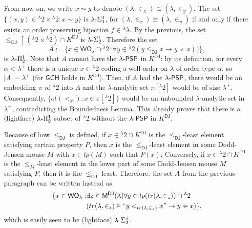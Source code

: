 \documentclass{amsart}
\numberwithin{equation}{section}
\def\hyp{{\hbox{-}}}
\theoremstyle{definition}
\theoremstyle{remark}
\begin{document}
From now on, we write $x \sim y$ to denote $(\lambda,\in_x) \cong (\lambda,\in_y)$.
 The set $\{(x,y)\in{}^{\lambda}2\times{}^{\lambda}2:x\sim y\}$ is $\lambda\hyp\Sigma^1_1$, for $(\lambda,\in_x)\cong(\lambda,\in_y)$ if and only if there exists an order preserving bijection $f\in{}^{\lambda}\lambda$.
By the previous, the set $\leq_{\mathsf{DJ}}\upharpoonright({}^{\lambda}2\times{}^{\lambda}2)\cap K^{\mathsf{DJ}}$ is $\lambda\hyp\Sigma^{1}_{2}$. Therefore the set $$A:=\{x\in\mathsf{WO}_{\lambda}\cap{}^{\lambda}2:\forall y\in{}^{\lambda}2(y\leq_{\mathsf{DJ}}x\rightarrow 
y\nsim x))\},$$ is $\lambda\hyp\Pi^{1}_{2}$. Note that $A$ cannot have the $\lambda\hyp\mathsf{PSP}$ in $K^{\mathsf{DJ}}$: by its definition, for every $\alpha<\lambda^{+}$ there is a unique $x\in{}^{\lambda}2$ coding a well-order on $\lambda$ of order type $\alpha$, so $|A|=\lambda^{+}$ (for $\mathsf{GCH}$ holds in $K^{\mathsf{DJ}}$). Then, if $A$ had the $\lambda\hyp\mathsf{PSP}$, there would be an embedding $\pi$ of ${}^{\lambda}2$ into $A$ and the $\lambda$-analytic set $\pi[{}^{\lambda}2]$ would be of size $\lambda^{+}$. Consequently, $\{ot(<_{x}):x\in\pi[{}^{\lambda}2]\}$ would be an unbounded $\lambda$-analytic set in $\lambda^{+}$, contradicting the Boundedness Lemma. This already proves that there is a (lightface) $\lambda\hyp\Pi^1_2$ subset of ${}^{\lambda}2$ without the $\lambda\hyp\mathsf{PSP}$ in $K^{\mathsf{DJ}}$.

Because of how $\leq_{\mathsf{DJ}}$ is defined, if $x\in{}^{\lambda}2\cap K^{\mathsf{DJ}}$ is the $\leq_{\mathsf{DJ}}$-least element satisfying certain property $P$, then $x$ is the $\leq_{\mathsf{DJ}}$-least element in some Dodd-Jensen mouse $M$ with $x\in lp(M)$ such that $P(x)$. Conversely, if $x\in{}^{\lambda}2\cap K^{\mathsf{DJ}}$ is the $\leq_{M}$-least element in the lower part of some Dodd-Jensen mouse $M$ satisfying $P$, then it is the $\leq_{\mathsf{DJ}}$-least. Therefore, the set $A$ from the previous paragraph can be written instead as
\begin{equation*}
	\begin{split}
		\{x\in\mathsf{WO}_\lambda:&\exists z\in\mathsf{M^{DJ}}(\lambda)\forall y\in lp(tr(\lambda,\in_{z}))\cap{}^{\lambda}2\\&(tr(\lambda,\in_{z})\vDash``y<_{tr(\lambda,\in_{z})} x"\rightarrow y\nsim x)\},
	\end{split}
\end{equation*}
which is easily seen to be (lightface) $\lambda\hyp\Sigma^1_2$.
\end{document}
